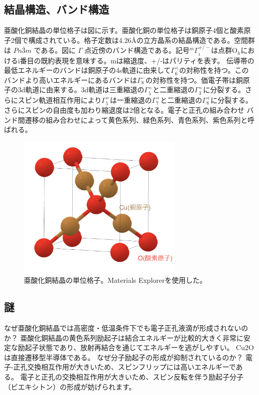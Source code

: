 \subsection{結晶構造、バンド構造}
亜酸化銅結晶の単位格子は図に示す。亜酸化銅の単位格子は銅原子4個と酸素原子2個で構成されている。格子定数は4.26Åの立方晶系の結晶構造である。空間群は \(Pn\bar{3}m\) である。図に \(\Gamma\) 点近傍のバンド構造である。記号\(^{m}\Gamma^{+/-}_{i}\)は点群O$_{h}$におけるi番目の既約表現を意味する。mは縮退度、+/-はパリティを表す。
伝導帯の最低エネルギーのバンドは銅原子の4s軌道に由来して\(\Gamma^{+}_{6}\)の対称性を持つ。このバンドより高いエネルギーにあるバンドは\(\Gamma^{-}_{8}\)の対称性を持つ。価電子帯は銅原子の3d軌道に由来する。3d軌道は三重縮退の\(\Gamma^{+}_{5}\)と二重縮退の\(\Gamma^{+}_{3}\)に分裂する。さらにスピン軌道相互作用により\(\Gamma^{+}_{5}\)は一重縮退の\(\Gamma^{+}_{7}\)と二重縮退の\(\Gamma^{+}_{8}\)に分裂する。さらにスピンの自由度も加わり縮退度は2倍となる。電子と正孔の組み合わせ
バンド間遷移の組み合わせによって黄色系列、緑色系列、青色系列、紫色系列と呼ばれる。

\begin{figure}[htbp]
\begin{center}
\includegraphics[width=80mm]{Screen_2024-07-02_2.21.43.eps}
\caption{亜酸化銅結晶の単位格子。Materials Explorerを使用した。}
\end{center}
\end{figure}

\subsection{謎}
なぜ亜酸化銅結晶では高密度・低温条件下でも電子正孔液滴が形成されないのか？
亜酸化銅結晶の黄色系列励起子は結合エネルギーが比較的大きく非常に安定な励起子状態であり、放射再結合を通じてエネルギーを逃がしやすい。
Cu2Oは直接遷移型半導体である。
なぜ分子励起子の形成が抑制されているのか？
電子-正孔交換相互作用が大きいため、スピンフリップには高いエネルギーである。
電子と正孔の交換相互作用が大きいため、スピン反転を伴う励起子分子（ビエキシトン）の形成が妨げられます。


